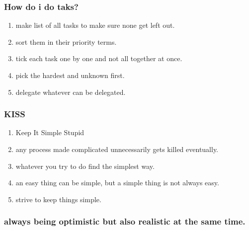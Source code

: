 \documentclass[11pt]{article}
\begin{document}
\subsubsection{How do i do taks?}
\label{sec:orgfb1b87c}
\begin{enumerate}
\item make list of all tasks to make sure none get left out.
\label{sec:org821eb2c}
\item sort them in their priority terms.
\label{sec:orgbf788dd}
\item tick each task one by one and not all together at once.
\label{sec:org3e1a347}
\item pick the hardest and unknown first.
\label{sec:orgc23e99c}
\item delegate whatever can be delegated.
\label{sec:orgbb86e86}
\end{enumerate}
\subsubsection{KISS}
\label{sec:orgca82eff}
\begin{enumerate}
\item Keep It Simple Stupid
\label{sec:org553c4e2}
\item any process made complicated unnecessarily gets killed eventually.
\label{sec:org6faf6e8}
\item whatever you try to do find the simplest way.
\label{sec:org95ef5e4}
\item an easy thing can be simple, but a simple thing is not always easy.
\label{sec:orgda6c73e}
\item strive to keep things simple.
\label{sec:orgf5bd874}
\end{enumerate}
\subsubsection{always being optimistic but also realistic at the same time.}
\label{sec:org2259cc0}
\end{document}
